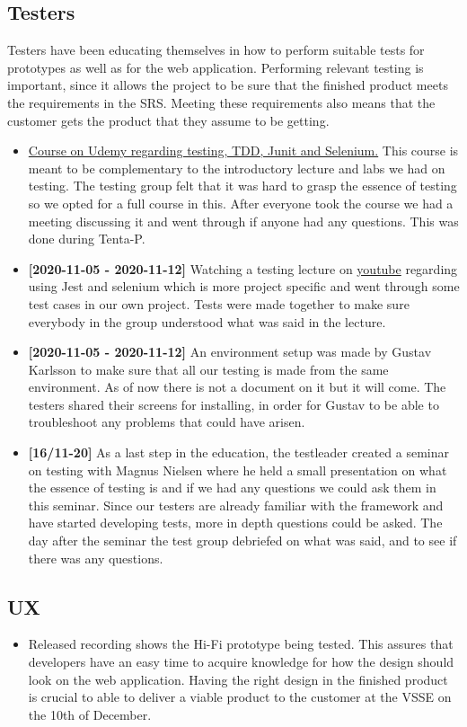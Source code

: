 \documentclass[12pt]{article}
\begin{document}
\subsection{Testers}
Testers have been educating themselves in how to perform suitable tests for prototypes as well as for the web application. Performing relevant testing is important, since it allows the project to be sure that the finished product meets the requirements in the SRS. Meeting these requirements also means that the customer gets the product that they assume to be getting.
\begin{itemize}
    \item \href{(https://www.udemy.com/course/what-a-java-software-developer-must-know-about-testing/)} {Course on Udemy regarding testing, TDD, Junit and Selenium.} This course is meant to be complementary to the introductory lecture and labs we had on testing. The testing group felt that it was hard to grasp the essence of testing so we opted for a full course in this. After everyone took the course we had a meeting discussing it and went through if anyone had any questions. This was done during Tenta-P.
    \item \textbf{[2020-11-05 - 2020-11-12]} Watching a testing lecture on  \href{(https://www.youtube.com/watch?v=mRW2E8uweEc)}{youtube} regarding using Jest and selenium which is more project specific and went through some test cases in our own project. Tests were made together to make sure everybody in the group understood what was said in the lecture. 
    \item \textbf{[2020-11-05 - 2020-11-12]} An environment setup was made by Gustav Karlsson to make sure that all our testing is made from the same environment. As of now there is not a document on it but it will come. The testers shared their screens for installing, in order for Gustav to be able to troubleshoot any problems that could have arisen. 
    \item \textbf{[16/11-20]} As a last step in the education, the testleader created a seminar on testing with Magnus Nielsen where he held a small presentation on what the essence of testing is and if we had any questions we could ask them in this seminar. Since our testers are already familiar with the framework and have started developing tests, more in depth questions could be asked. The day after the seminar the test group debriefed on what was said, and to see if there was any questions. 
\end{itemize}
\subsection{UX}
\begin{itemize}
    \item Released recording shows the Hi-Fi prototype being tested. This assures that developers have an easy time to acquire knowledge for how the design should look on the web application. Having the right design in the finished product is crucial to able to deliver a viable product to the customer at the VSSE on the 10th of December. 
\end{itemize}
\end{document}
